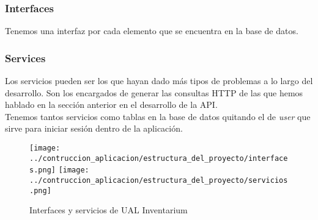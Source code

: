 \subsubsection{Interfaces}
Tenemos una interfaz por cada elemento que se encuentra en la base de datos.

\subsubsection{Services}
Los servicios pueden ser los que hayan dado más tipos de problemas a lo largo del desarrollo. Son los encargados de generar las consultas HTTP de las que hemos hablado en la sección anterior en el desarrollo de la API.
\\Tenemos tantos servicios como tablas en la base de datos quitando el de \textit{user} que sirve para iniciar sesión dentro de la aplicación.

\begin{figure}[h]
    \centering
    \texttt{[image: ../contruccion\_aplicacion/estructura\_del\_proyecto/interfaces.png]}
    \texttt{[image: ../contruccion\_aplicacion/estructura\_del\_proyecto/servicios.png]}
    \caption{Interfaces y servicios de UAL Inventarium}
\end{figure}


